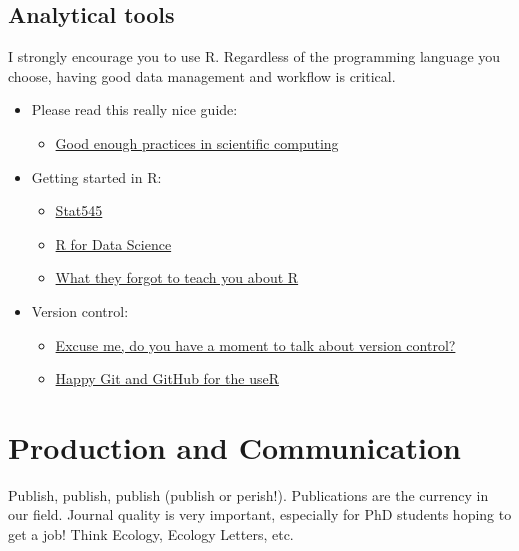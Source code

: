\documentclass[
]{article}
\providecommand{\tightlist}{%
  \setlength{\itemsep}{0pt}\setlength{\parskip}{0pt}}
\begin{document}
\hypertarget{analytical-tools}{%
\subsection{Analytical tools}\label{analytical-tools}}

I strongly encourage you to use R. Regardless of the programming language you choose, having good data management and workflow is critical.

\begin{itemize}
\tightlist
\item
  Please read this really nice guide:

  \begin{itemize}
  \tightlist
  \item
    \href{https://journals.plos.org/ploscompbiol/article?id=10.1371/journal.pcbi.1005510}{Good enough practices in scientific computing}
  \end{itemize}
\item
  Getting started in R:

  \begin{itemize}
  \tightlist
  \item
    \href{https://stat545.com/}{Stat545}
  \item
    \href{https://r4ds.had.co.nz/}{R for Data Science}
  \item
    \href{https://rstats.wtf/}{What they forgot to teach you about R}
  \end{itemize}
\item
  Version control:

  \begin{itemize}
  \tightlist
  \item
    \href{https://peerj.com/preprints/3159.pdf}{Excuse me, do you have a moment to talk about version control?}
  \item
    \href{https://happygitwithr.com/index.html}{Happy Git and GitHub for the useR}
  \end{itemize}
\end{itemize}

\hypertarget{production-and-communication}{%
\section{\texorpdfstring{\textbf{Production and Communication}}{Production and Communication}}\label{production-and-communication}}

Publish, publish, publish (publish or perish!). Publications are the currency in our field. Journal quality is very important, especially for PhD students hoping to get a job! Think Ecology, Ecology Letters, etc.
\end{document}
